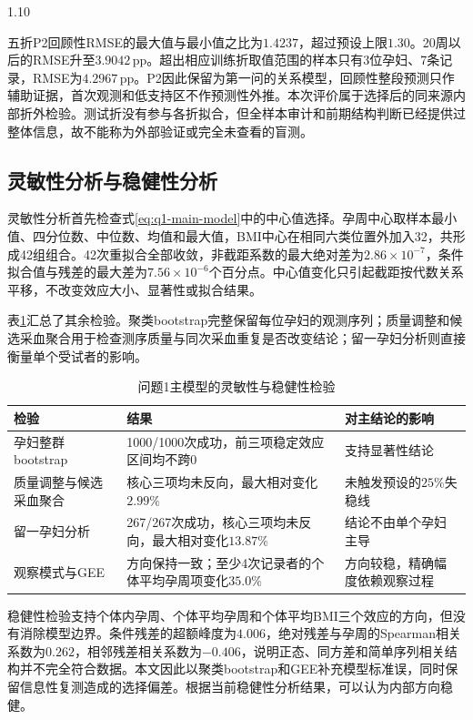 \documentclass[12pt,a4paper]{ctexrep}
\numberwithin{equation}{section}
\begin{document}
\begin{spacing}{1.10}
{			五折P2回顾性RMSE的最大值与最小值之比为$1.4237$，超过预设上限$1.30$。20周以后的RMSE升至$3.9042$\,pp。超出相应训练折取值范围的样本只有3位孕妇、7条记录，RMSE为$4.2967$\,pp。P2因此保留为第一问的关系模型，回顾性整段预测只作辅助证据，首次观测和低支持区不作预测性外推。本次评价属于选择后的同来源内部折外检验。测试折没有参与各折拟合，但全样本审计和前期结构判断已经提供过整体信息，故不能称为外部验证或完全未查看的盲测。

			\subsection{灵敏性分析与稳健性分析}
			\label{subsec:q1-robustness}

			灵敏性分析首先检查式\eqref{eq:q1-main-model}中的中心值选择。孕周中心取样本最小值、四分位数、中位数、均值和最大值，BMI中心在相同六类位置外加入32，共形成42组组合。42次重拟合全部收敛，非截距系数的最大绝对差为$2.86\times10^{-7}$，条件拟合值与残差的最大差为$7.56\times10^{-6}$个百分点。中心值变化只引起截距按代数关系平移，不改变效应大小、显著性或拟合结果。

			表\ref{tab:q1-robustness}汇总了其余检验。聚类bootstrap完整保留每位孕妇的观测序列；质量调整和候选采血聚合用于检查测序质量与同次采血重复是否改变结论；留一孕妇分析则直接衡量单个受试者的影响。

			\begin{table}[H]
				\centering
				\caption{问题1主模型的灵敏性与稳健性检验}
				\label{tab:q1-robustness}
				\small
				\renewcommand{\arraystretch}{1.15}
				\begin{tabularx}{\textwidth}{lXX}
					\toprule
					检验 & 结果 & 对主结论的影响 \\
					\midrule
					孕妇整群bootstrap & 1000/1000次成功，前三项稳定效应区间均不跨0 & 支持显著性结论 \\
					质量调整与候选采血聚合 & 核心三项均未反向，最大相对变化$2.99\%$ & 未触发预设的$25\%$失稳线 \\
					留一孕妇分析 & 267/267次成功，核心三项均未反向，最大相对变化$13.87\%$ & 结论不由单个孕妇主导 \\
					观察模式与GEE & 方向保持一致；至少4次记录者的个体平均孕周项变化$35.0\%$ & 方向较稳，精确幅度依赖观察过程 \\
					\bottomrule
				\end{tabularx}
			\end{table}

			稳健性检验支持个体内孕周、个体平均孕周和个体平均BMI三个效应的方向，但没有消除模型边界。条件残差的超额峰度为$4.006$，绝对残差与孕周的Spearman相关系数为$0.262$，相邻残差相关系数为$-0.406$，说明正态、同方差和简单序列相关结构并不完全符合数据。本文因此以聚类bootstrap和GEE补充模型标准误，同时保留信息性复测造成的选择偏差。根据当前稳健性分析结果，可以认为内部方向稳健。

}
\end{spacing}
\end{document}
